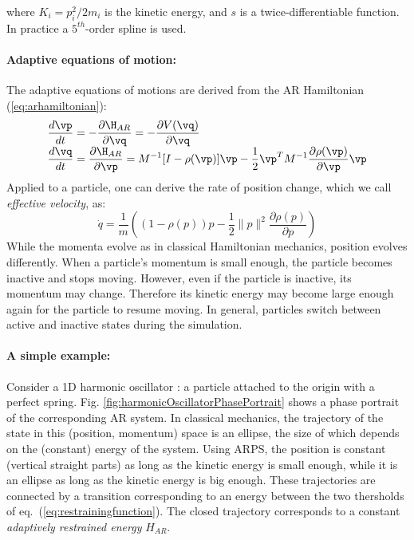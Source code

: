 where $K_i=p_i^2/2m_i$ is the kinetic energy, and
$s$ is a twice-differentiable function. In practice a $5^{th}$-order spline is used.
\paragraph*{Adaptive equations of motion:}
The adaptive equations of motions are derived from the AR Hamiltonian (\ref{eq:arhamiltonian}):
$$
    \begin{array}{l}
        \displaystyle \frac{d\vp}{dt} =
        -\frac{\partial \H_{AR}}{\partial \vq} = -\frac{\partial V(\vq)}{\partial \vq} \\
        \displaystyle \frac{d\vq}{dt} =
       \frac{\partial \H_{AR}}{\partial \vp} = M^{-1}[I - \rho(\vp)] \vp
        - \frac{1}{2}\vp^{T}M^{-1}\frac{\partial \rho(\vp)}{\partial \vp}\vp\\
    \end{array}
$$
Applied to a particle, one can derive the rate of position change, which we call \textit{effective velocity}, as:
\begin{equation}
    \label{eq:adaptiveVelocity}
    \dot{q} = \frac{1}{m}\left((1-\rho(p))p - \frac{1}{2}\parallel p \parallel^2\frac{\partial \rho(p)}{\partial p}\right)
\end{equation}
While the momenta evolve as in classical Hamiltonian mechanics, position evolves differently.
When a particle's momentum is small enough, the particle becomes inactive and stops moving.
However, even if the particle is inactive, its momentum may change.
Therefore its kinetic energy may become large enough again for the particle to resume moving.
In general, particles switch between active and inactive states during the simulation.
\paragraph*{A simple example:}
Consider a 1D harmonic oscillator : a particle attached to the origin with a perfect spring.
Fig. \ref{fig:harmonicOscillatorPhasePortrait} shows a phase portrait of the corresponding
AR system.
In classical mechanics, the trajectory of the state in this (position, momentum) space is an ellipse, the size of which depends on the (constant) energy of the system.
Using ARPS, the position is constant (vertical straight parts) as long as the kinetic energy is small enough, while it is an ellipse as long as the kinetic energy is big enough.
These trajectories are connected by a transition corresponding to an energy between the two thersholds of eq.~(\ref{eq:restrainingfunction}).
The closed trajectory corresponds to a constant \textit{adaptively restrained energy} $H_{AR}$.

